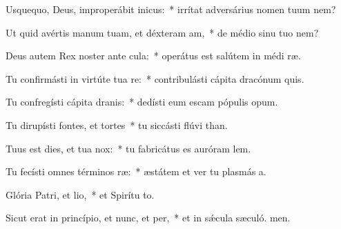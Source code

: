 \item Usquequo, Deus, improperábit inicus:~* irrítat adversárius nomen tuum  nem?
\item Ut quid avértis manum tuam, et déxteram am,~* de médio sinu tuo  nem?
\item Deus autem Rex noster ante cula:~* operátus est salútem in médi ræ.
\item Tu confirmásti in virtúte tua re:~* contribulásti cápita dracónum  quis.
\item Tu confregísti cápita dranis:~* dedísti eum escam pópulis opum.
\item Tu dirupísti fontes, et tortes~* tu siccásti flúvi than.
\item Tuus est dies, et tua  nox:~* tu fabricátus es auróram  lem.
\item Tu fecísti omnes términos ræ:~* æstátem et ver tu plasmás a.
\item Glória Patri, et lio,~* et Spirítu to.
\item Sicut erat in princípio, et nunc, et per,~* et in sǽcula sæculó. men.
